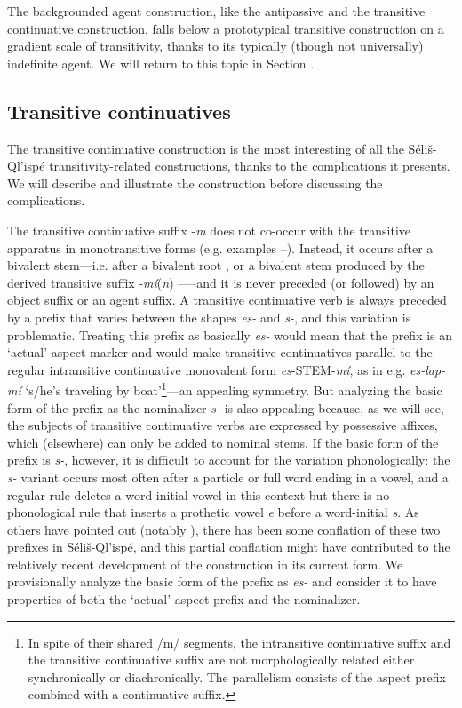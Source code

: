 \documentclass[output=paper,colorlinks,citecolor=brown]{langscibook}
\begin{document}
The backgrounded agent construction, like the antipassive and the
transitive continuative construction, falls below a prototypical
transitive construction on a gradient scale of transitivity, thanks to
its typically (though not universally) indefinite agent.  We will
return to this topic in Section .

\subsection{Transitive continuatives}  %
\label{thomason_section_2.6}

The transitive continuative construction is the most interesting of
all the S\'eli\v{s}-Ql'isp\'e transitivity-related constructions,
thanks to the complications it presents.  We will describe and
illustrate the construction before discussing the complications.

The transitive continuative suffix -\emph{m} does not co-occur with
the transitive apparatus in monotransitive forms (e.g.  examples --).
Instead, it occurs after a bivalent stem---i.e. after a bivalent root
,  or a bivalent stem produced by the derived transitive suffix
-\emph{m\'i}(\emph{n}) -----and it is never preceded (or
followed) by an object suffix or an agent suffix.  A transitive
continuative verb is always preceded by a prefix that varies between
the shapes \emph{es-} and \emph{s-}, and this variation is
problematic.  Treating this prefix as basically \emph{es-} would mean
that the prefix is an `actual' aspect marker and would make transitive
continuatives parallel to the regular intransitive continuative
monovalent form \emph{es}-STEM-\emph{m\'i}, as in
e.g. \emph{es-lap-m\'i} `s/he's traveling by boat'\footnote{In spite
of their shared /m/ segments, the intransitive continuative suffix and
the transitive continuative suffix are not morphologically related
either synchronically or diachronically. The parallelism consists of
the aspect prefix combined with a continuative suffix.  }---an
appealing symmetry.  But analyzing the basic form of the prefix as the
nominalizer \emph{s-} is also appealing because, as we will see, the
subjects of transitive continuative verbs are expressed by possessive
affixes, which (elsewhere) can only be added to nominal stems.  If the
basic form of the prefix is \emph{s-}, however, it is difficult to
account for the variation phonologically: the \emph{s-} variant occurs
most often after a particle or full word ending in a vowel, and a
regular rule deletes a word-initial vowel in this context but there
is no phonological rule that inserts a prothetic vowel \emph{e} before
a word-initial \emph{s}.  As others have pointed out (notably
\citet{Kroeber:1999}), there has been some conflation of these two
prefixes in S\'eli\v{s}-Ql'isp\'e, and this partial conflation might
have contributed to the relatively recent development of the
construction in its current form.  We provisionally analyze the basic
form of the prefix as \emph{es-} and consider it to have properties of
both the `actual' aspect prefix and the nominalizer.
\end{document}
